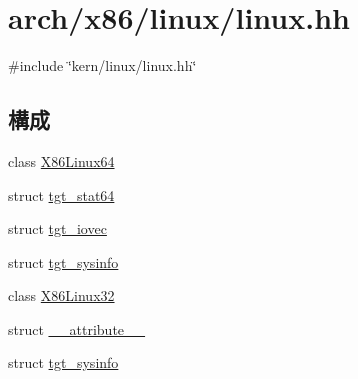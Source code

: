 \hypertarget{arch_2x86_2linux_2linux_8hh}{
\section{arch/x86/linux/linux.hh}
\label{arch_2x86_2linux_2linux_8hh}
}
{\ttfamily \#include \char`\"{}kern/linux/linux.hh\char`\"{}}\par
\subsection*{構成}
\begin{DoxyCompactItemize}
\item 
class \hyperlink{classX86Linux64}{X86Linux64}
\item 
struct \hyperlink{structX86Linux64_1_1tgt__stat64}{tgt\_\-stat64}
\item 
struct \hyperlink{structX86Linux64_1_1tgt__iovec}{tgt\_\-iovec}
\item 
struct \hyperlink{structX86Linux64_1_1tgt__sysinfo}{tgt\_\-sysinfo}
\item 
class \hyperlink{classX86Linux32}{X86Linux32}
\item 
struct \hyperlink{structX86Linux32_1_1____attribute____}{\_\-\_\-attribute\_\-\_\-}
\item 
struct \hyperlink{structX86Linux32_1_1tgt__sysinfo}{tgt\_\-sysinfo}
\end{DoxyCompactItemize}

